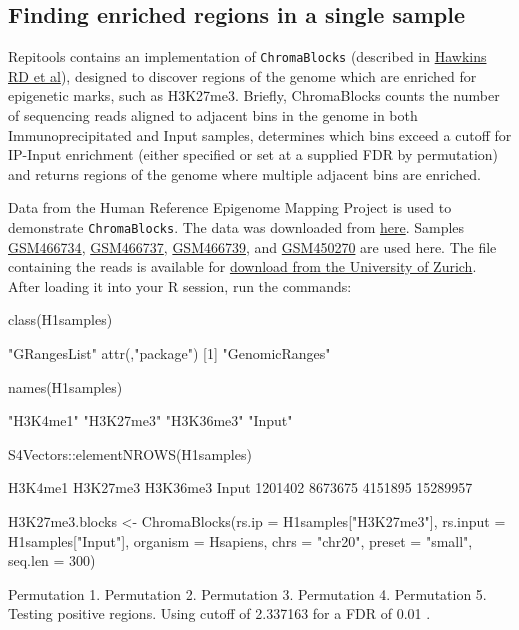 \subsection{Finding enriched regions in a single sample}
Repitools contains an implementation of \texttt{ChromaBlocks} (described in \href{http://www.ncbi.nlm.nih.gov/pubmed/20452322}{Hawkins RD et al}), designed to discover regions of the genome which are enriched for epigenetic marks, such as H3K27me3. Briefly, ChromaBlocks counts the number of sequencing reads aligned to adjacent bins in the genome in both Immunoprecipitated and Input samples, determines which bins exceed a cutoff for IP-Input enrichment (either specified or set at a supplied FDR by permutation) and returns regions of the genome where multiple adjacent bins are enriched.

\noindent Data from the Human Reference Epigenome Mapping Project is used to demonstrate \texttt{ChromaBlocks}. The data was downloaded from \href{http://www.ncbi.nlm.nih.gov/geo/query/acc.cgi?acc=GSE16256}{here}. Samples \href{http://www.ncbi.nlm.nih.gov/geo/query/acc.cgi?acc=GSM466734}{GSM466734}, \href{http://www.ncbi.nlm.nih.gov/geo/query/acc.cgi?acc=GSM466737}{GSM466737}, \href{http://www.ncbi.nlm.nih.gov/geo/query/acc.cgi?acc=GSM466739}{GSM466739}, and \href{http://www.ncbi.nlm.nih.gov/projects/geo/query/acc.cgi?acc=GSM450270}{GSM450270} are used here. The file containing the reads is available for \href{http://imlspenticton.uzh.ch/dump/H1samples.RData}{download from the University of Zurich}. After loading it into your R session, run the commands:

\begin{Schunk}
\begin{Sinput}
 class(H1samples)
\end{Sinput}
\begin{Soutput}
[1] "GRangesList"
attr(,"package")
[1] "GenomicRanges"
\end{Soutput}
\begin{Sinput}
 names(H1samples)
\end{Sinput}
\begin{Soutput}
[1] "H3K4me1"  "H3K27me3" "H3K36me3" "Input"   
\end{Soutput}
\begin{Sinput}
 S4Vectors::elementNROWS(H1samples)
\end{Sinput}
\begin{Soutput}
 H3K4me1 H3K27me3 H3K36me3    Input 
 1201402  8673675  4151895 15289957 
\end{Soutput}
\begin{Sinput}
 H3K27me3.blocks <- ChromaBlocks(rs.ip = H1samples["H3K27me3"],
                                 rs.input = H1samples["Input"],
                                 organism = Hsapiens, chrs = "chr20",
                                 preset = "small", seq.len = 300)
\end{Sinput}
\begin{Soutput}
Permutation 1.
Permutation 2.
Permutation 3.
Permutation 4.
Permutation 5.
Testing positive regions.
Using cutoff of 2.337163 for a FDR of 0.01 
.
\end{Soutput}
\end{Schunk}


